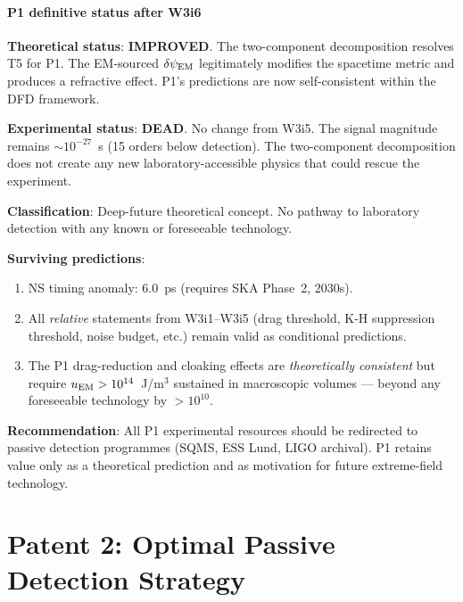 \documentclass[11pt]{article}
\newcommand{\dpsiEM}{\delta\psi_{\rm EM}}
\theoremstyle{definition}
\theoremstyle{remark}
\begin{document}
\subsection{P1 definitive status after W3i6}
\label{ssec:P1_status}

\begin{tcolorbox}[colback=red!3!white, colframe=red!60!black,
  title=\textbf{W3i6 P1: Definitive Assessment}]

\textbf{Theoretical status}: \textcolor{strongcolor}{\textbf{IMPROVED}}.
The two-component decomposition resolves T5 for P1. The EM-sourced
$\dpsiEM$ legitimately modifies the spacetime metric and produces a
refractive effect. P1's predictions are now self-consistent within the
DFD framework.

\textbf{Experimental status}: \textcolor{falsified}{\textbf{DEAD}}.
No change from W3i5. The signal magnitude remains $\sim 10^{-27}$~s
(15 orders below detection). The two-component decomposition does not
create any new laboratory-accessible physics that could rescue the
experiment.

\textbf{Classification}: Deep-future theoretical concept. No pathway
to laboratory detection with any known or foreseeable technology.

\textbf{Surviving predictions}:
\begin{enumerate}[nosep]
\item NS timing anomaly: 6.0~ps (requires SKA Phase~2, 2030s).
\item All \emph{relative} statements from W3i1--W3i5 (drag threshold,
  K-H suppression threshold, noise budget, etc.) remain valid as
  conditional predictions.
\item The P1 drag-reduction and cloaking effects are \emph{theoretically
  consistent} but require $u_{\rm EM} > 10^{14}$~J/m$^3$ sustained in
  macroscopic volumes --- beyond any foreseeable technology by $> 10^{10}$.
\end{enumerate}

\textbf{Recommendation}: All P1 experimental resources should be
redirected to passive detection programmes (SQMS, ESS Lund, LIGO archival).
P1 retains value only as a theoretical prediction and as motivation for
future extreme-field technology.
\end{tcolorbox}

\part{Patent 2: Optimal Passive Detection Strategy}
\label{part:P2}
\end{document}
